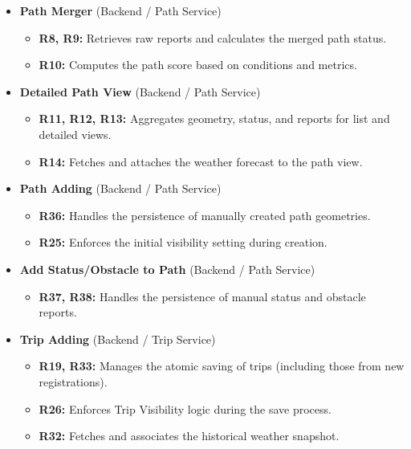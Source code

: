 \begin{itemize}
    \item \textbf{Path Merger} (Backend / Path Service)
    \begin{itemize}
        \item \textbf{R8, R9:} Retrieves raw reports and calculates the merged path status.
        \item \textbf{R10:} Computes the path score based on conditions and metrics.
    \end{itemize}

    \item \textbf{Detailed Path View} (Backend / Path Service)
    \begin{itemize}
        \item \textbf{R11, R12, R13:} Aggregates geometry, status, and reports for list and detailed views.
        \item \textbf{R14:} Fetches and attaches the weather forecast to the path view.
    \end{itemize}

    \item \textbf{Path Adding} (Backend / Path Service)
    \begin{itemize}
        \item \textbf{R36:} Handles the persistence of manually created path geometries.
        \item \textbf{R25:} Enforces the initial visibility setting during creation.
    \end{itemize}

    \item \textbf{Add Status/Obstacle to Path} (Backend / Path Service)
    \begin{itemize}
        \item \textbf{R37, R38:} Handles the persistence of manual status and obstacle reports.
    \end{itemize}

    \item \textbf{Trip Adding} (Backend / Trip Service)
    \begin{itemize}
        \item \textbf{R19, R33:} Manages the atomic saving of trips (including those from new registrations).
        \item \textbf{R26:} Enforces Trip Visibility logic during the save process.
        \item \textbf{R32:} Fetches and associates the historical weather snapshot.
    \end{itemize}


\end{itemize}
